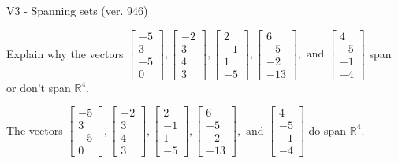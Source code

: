 \begin{exercise}
  \begin{exerciseTitle}V3 - Spanning sets (ver. 946)\end{exerciseTitle}
  \begin{exerciseStatement}
    Explain why the vectors \(\left[\begin{array}{r}
-5 \\
3 \\
-5 \\
0
\end{array}\right] , \left[\begin{array}{r}
-2 \\
3 \\
4 \\
3
\end{array}\right] , \left[\begin{array}{r}
2 \\
-1 \\
1 \\
-5
\end{array}\right] , \left[\begin{array}{r}
6 \\
-5 \\
-2 \\
-13
\end{array}\right] , \text{ and } \left[\begin{array}{r}
4 \\
-5 \\
-1 \\
-4
\end{array}\right]\) span or don't span \(\mathbb{R}^4\). 
	


  \end{exerciseStatement}
  \begin{exerciseAnswer}
   The vectors \(\left[\begin{array}{r}
-5 \\
3 \\
-5 \\
0
\end{array}\right] , \left[\begin{array}{r}
-2 \\
3 \\
4 \\
3
\end{array}\right] , \left[\begin{array}{r}
2 \\
-1 \\
1 \\
-5
\end{array}\right] , \left[\begin{array}{r}
6 \\
-5 \\
-2 \\
-13
\end{array}\right] , \text{ and } \left[\begin{array}{r}
4 \\
-5 \\
-1 \\
-4
\end{array}\right]\) 
  	 do  
	span \(\mathbb{R}^4\).
  



\end{exerciseAnswer}
\end{exercise}

